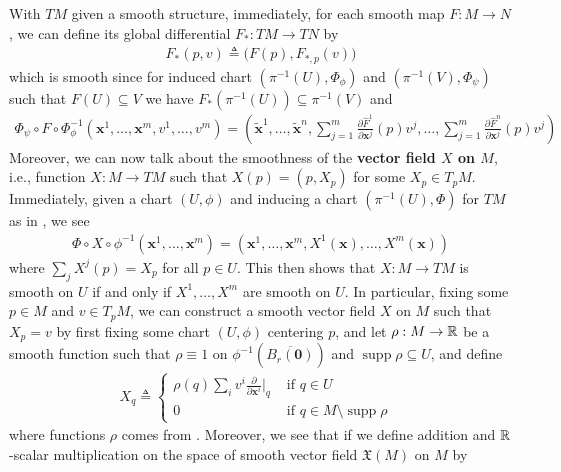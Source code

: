 \documentclass{report}
\begin{document}
\begin{mdframed}
With $TM$ given a smooth structure, immediately, for each smooth map $F:M\rightarrow N$, we can define its global differential $F_*:TM\rightarrow TN$ by 
\begin{align*}
F_*(p,v)\triangleq \Big(F(p),F_{*,p}(v) \Big)
\end{align*}
which is smooth since for induced chart $(\pi ^{-1}(U),\Phi_{\phi})$ and $(\pi^{-1}(V),\Phi_{\psi})$ such that $F(U)\subseteq V$ we have $F_*(\pi^{-1}(U))\subseteq \pi^{-1}(V)$ and 
\begin{align*}
\Phi_\psi \circ F \circ \Phi_{\phi}^{-1} (\textbf{x}^1,\dots ,\textbf{x}^m,v^1,\dots ,v^m)= (\tilde{\textbf{x}}^1,\dots ,\tilde{\textbf{x}}^n, \sum_{j=1}^m \frac{\partial \widehat{F}^1}{ \partial \textbf{x}^j} (p)v^j, \dots , \sum_{j=1}^m \frac{\partial  \widehat{F}^n}{\partial \textbf{x}^j}(p)v^j  )
\end{align*}
Moreover, we can now talk about the smoothness of the \textbf{vector field $X$ on  $M$}, i.e., function $X:M\rightarrow TM$ such that $X(p)=(p,X_p)$ for some $X_p \in T_pM$. Immediately, given a chart $(U,\phi)$ and inducing a chart $(\pi^{-1}(U),\Phi)$ for $TM$ as in , we see 
\begin{align*}
\Phi \circ X \circ \phi^{-1}(\textbf{x}^1,\dots, \textbf{x}^m)=(\textbf{x}^1,\dots , \textbf{x}^m , X^1(\textbf{x}),\dots ,X^m(\textbf{x}))
\end{align*}
where $\sum_j X^j(p)=X_p$ for all $p \in U$. This then shows that $X:M\rightarrow TM$ is smooth on $U$ if and only if $X^1,\dots ,X^m$  are smooth on $U$. In particular, fixing some $p\in  M$ and $v \in T_pM$, we can construct a smooth vector field $X$ on  $M$ such that  $X_p=v$ by first fixing some chart  $(U,\phi)$ centering $p$, and let $\rho: M\rightarrow \mathbb{R}$ be a smooth function such that $\rho\equiv 1$ on $\phi^{-1}(\overline{B_r(\textbf{0})})$ and $\operatorname{supp}\rho \subseteq U$, and define 
\begin{align*}
X_q\triangleq \begin{cases}
   \rho (q) \sum_i v^i \frac{\partial }{\partial \textbf{x}^i}\Big|_q& \text{ if $q\in  U$ }\\
   0& \text{ if $q \in M \setminus \operatorname{supp}\rho$ }
\end{cases}
\end{align*}
where functions $\rho$ comes from .  Moreover, we see that if we define addition and $\mathbb{R}$-scalar  multiplication on the space of smooth vector field $\mathfrak{X}(M)$ on $M$ by 
 \begin{align*}

\end{align*}
\end{mdframed}
\end{document}
